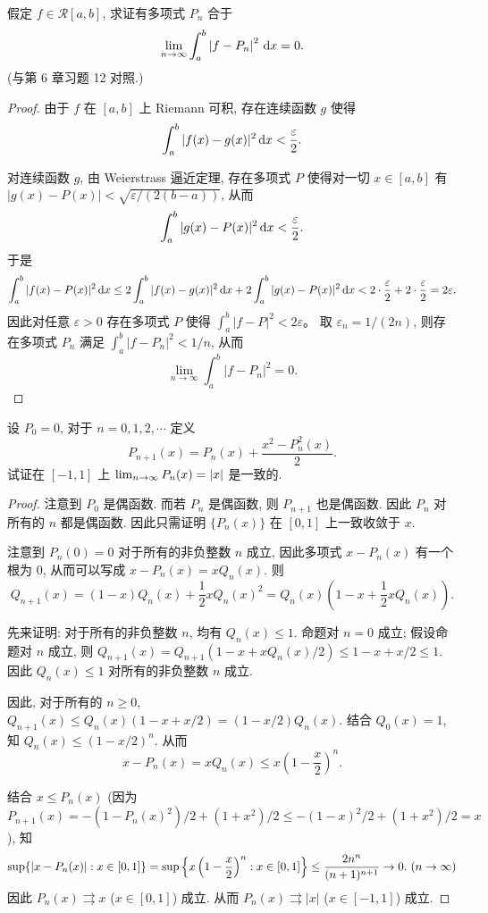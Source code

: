 \documentclass{article}
\begin{document}
\begin{problem}[7-22]
假定 $f \in \mathcal{R}[a,b]$, 求证有多项式 $P_n$ 合于
\[
\lim_{n\to\infty} \int_a^b \left|f - P_n\right|^2 \,\mathrm{d} x = 0.
\]
(与第 6 章习题 12 对照.)
\end{problem}

\begin{proof}
由于 $f$ 在 $[a,b]$ 上 Riemann 可积, 存在连续函数 $g$ 使得
\[
\int_a^b |f(x)-g(x)|^2 \,\mathrm{d} x < \frac{\varepsilon}{2}.
\]

对连续函数 $g$, 由 Weierstrass 逼近定理, 存在多项式 $P$ 使得对一切 $x\in[a,b]$ 有 $|g(x)-P(x)|<\sqrt{\varepsilon/(2(b-a))}$, 从而
\[
\int_a^b |g(x)-P(x)|^2 \,\mathrm{d} x < \frac{\varepsilon}{2}.
\]
于是
\[
\int_a^b |f(x)-P(x)|^2 \,\mathrm{d} x
\le 2\int_a^b |f(x)-g(x)|^2 \,\mathrm{d} x + 2\int_a^b |g(x)-P(x)|^2 \,\mathrm{d} x
< 2\cdot\frac{\varepsilon}{2} + 2\cdot\frac{\varepsilon}{2} = 2\varepsilon.
\]
因此对任意 $\varepsilon>0$ 存在多项式 $P$ 使得 $\int_a^b |f-P|^2 < 2\varepsilon$。  
取 $\varepsilon_n = 1/(2n)$, 则存在多项式 $P_n$ 满足 $\int_a^b |f-P_n|^2 < 1/n$, 从而
\[
\lim_{n\to\infty} \int_a^b |f-P_n|^2 = 0.
\]
\end{proof}



\begin{problem}[7-23]
设 $P_0 = 0$, 对于 $n = 0, 1, 2, \cdots$ 定义
\[
P_{n+1}(x) = P_n(x) + \frac{x^2 - P_n^2(x)}{2}.
\]
试证在 $[-1, 1]$ 上 $\lim_{n \to \infty} P_n(x) = \left|x\right|$ 是一致的.
\end{problem}

\begin{proof}
  注意到 \( P_0 \) 是偶函数. 而若 \( P_n \) 是偶函数, 则 \( P_{n+1} \) 也是偶函数. 因此 \( P_n \) 对所有的 \( n \) 都是偶函数. 因此只需证明 \( \{P_n(x)\} \) 在 \( [0,1] \) 上一致收敛于 \( x \). 

  注意到 \( P_n(0)=0 \) 对于所有的非负整数 \( n \) 成立, 因此多项式 \( x-P_n(x) \) 有一个根为 \( 0 \), 从而可以写成 \( x-P_n(x) = xQ_n(x) \). 则
  \[ Q_{n+1}(x) = (1-x)Q_n(x)+\frac{1}{2}xQ_n(x)^2 = Q_n(x)\left( 1-x+\frac{1}{2}xQ_n(x) \right). \]

  先来证明: 对于所有的非负整数 \( n \), 均有 \( Q_n(x)\le 1 \). 命题对 \( n=0 \) 成立; 假设命题对 \( n \) 成立, 则 \( Q_{n+1}(x)=Q_{n+1}(1-x+xQ_n(x)/2)\le 1-x+x/2\le 1 \). 因此 \( Q_n(x)\le 1 \) 对所有的非负整数 \( n \) 成立.

  因此, 对于所有的 \( n\ge 0 \), \( Q_{n+1}(x)\le Q_n(x)(1-x+x/2)=(1-x/2)Q_n(x) \). 结合 \( Q_0(x)=1 \), 知 \( Q_n(x)\le (1-x/2)^n \). 从而
  \[ x - P_n(x) = xQ_n(x) \le x \left( 1-\frac{x}{2} \right)^n. \]

  结合 \( x\le P_n(x) \) (因为 \( P_{n+1}(x)=-(1-P_n(x)^2)/2+(1+x^2)/2 \le -(1-x)^2/2+(1+x^2)/2 = x \)), 知
  \[ \sup\{\left|x-P_n(x)\right|: x\in[0,1]\} = \sup\left\{ x\left( 1-\frac{x}{2} \right)^n: x\in[0,1] \right\}\le \frac{2n^n}{(n+1)^{n+1}}\to 0.\ (n\to\infty) \]
  因此 \( P_n(x) \rightrightarrows x \) (\( x\in[0,1] \)) 成立. 从而 \( P_n(x) \rightrightarrows |x| \) (\( x\in[-1,1] \)) 成立.
\end{proof}
\end{document}
